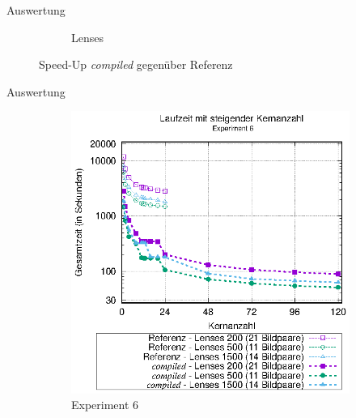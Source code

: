 \begin{frame}{Auswertung}
\begin{center}
\begin{figure}[h]
\begin{subfigure}[b]{0.45\textwidth}
				\caption{Lenses}
			\end{subfigure}
			\caption{Speed-Up \textit{compiled} gegenüber Referenz}
		\end{figure}
	\end{center}
\end{frame}

\begin{frame}{Auswertung}
	\begin{center}
	\begin{figure}[h]
		\begin{subfigure}[b]{0.45\textwidth}
			\centering
			\includegraphics[width=\textwidth]{pdf/best_times_exp6}
			\caption{Experiment 6}
		\end{subfigure}
		\hfill
		\begin{subfigure}[b]{0.45\textwidth}
			\centering

\end{subfigure}
\end{figure}
\end{center}
\end{frame}
